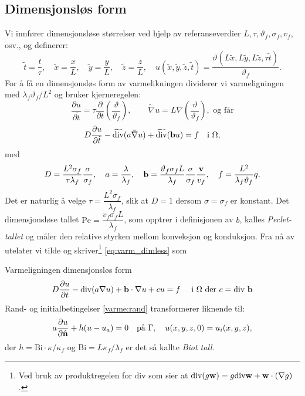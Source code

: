 \subsection*{Dimensjonsløs form}
Vi innfører dimensjonsløse størrelser ved hjelp av referanseverdier \( L, \tau, \vartheta_f, \sigma_f, v_f \), osv., og definerer:
\[
\tilde{t} = \frac{t}{\tau}, \quad \tilde{x} = \frac{x}{L},\quad \tilde{y} = \frac{y}{L},\quad \tilde{z} = \frac{z}{L}, \quad u(\tilde{x},\tilde{y},\tilde{z}, \tilde{t}) = \frac{\vartheta(L \tilde{x},L \tilde{y},L \tilde{z}, \tau \tilde{t})}{\vartheta_f}.
\]
For å få en dimensjonsløs form av varmelikningen dividerer vi varmeligningen med \( \lambda_f \vartheta_f / L^2 \) og bruker kjerneregelen:
\[\frac{\partial u}{\partial \tilde{t}} = \tau \frac{\partial}{\partial t}\left(\frac{\vartheta}{\vartheta_f}\right), \qquad \tilde{\nabla} u = L\nabla \left(\frac{\vartheta}{\vartheta_f}\right), \text{ og får}\]
\begin{equation}\label{eq:varm_dimless}
D \frac{\partial u}{\partial \tilde{t}} - \widetilde{\text{div}} (a \tilde{\nabla} u) + \widetilde{\text{div}} (\mathbf{b}u) = f \quad \text{i } \Omega,
\end{equation}
med
\[
D = \frac{L^2 \sigma_f}{\tau \lambda_f}\frac{\sigma}{\sigma_f}, \quad a = \frac{\lambda}{\lambda_f}, \quad \mathbf{b} = \frac{\vartheta_f \sigma_f L}{\lambda_f}\frac{\sigma}{\sigma_f} \frac{\mathbf{v}}{v_f}, \quad f=\frac{L^2}{\lambda_f \vartheta_f}q.
\]
Det er naturlig å velge \( \tau = \dfrac{L^2 \sigma_f}{\lambda_f} \), slik at \( D = 1 \) dersom \( \sigma = \sigma_f \) er konstant. Det dimensjonsløse tallet \( \mathrm{Pe} = \dfrac{v_f \sigma_f L}{\lambda_f} \), som opptrer i definisjonen av \( b \), kalles \emph{Peclet-tallet} og måler den relative styrken mellom konveksjon og konduksjon. Fra nå av utelater vi tilde og skriver\footnote{Ved bruk av produktregelen for $\text{div}$ som sier at $\text{div}(g\mathbf{w})=g\text{div}\mathbf{w} +\mathbf{w} \cdot (\nabla g)$.} \eqref{eq:varm_dimless} som

\begin{oppsum}{Varmeligningen dimensjonsløs form}
\begin{align}\label{varme:dimless}
D\frac{\partial u}{\partial t} - \text{div} (a\nabla u)+\mathbf{b}\cdot \nabla u +cu=f \quad \text{ i } \Omega \text{ der } c=\text{div } \mathbf{b}
\end{align}
Rand- og initialbetingelser \eqref{varme:rand} transformerer liknende til:
\begin{align}\label{varme:rand2}
a \frac{\partial u}{\partial \hat{\mathbf{n}}} + h(u - u_a) = 0 \quad \text{på } \Gamma, \quad u(x,y,z, 0) = u_i(x,y,z),
\end{align}
der \( h = \text{Bi} \cdot \kappa/\kappa_f \) og $\text{Bi} = L\kappa_f/\lambda_f$ er det så kallte \emph{Biot tall}.
\end{oppsum}

